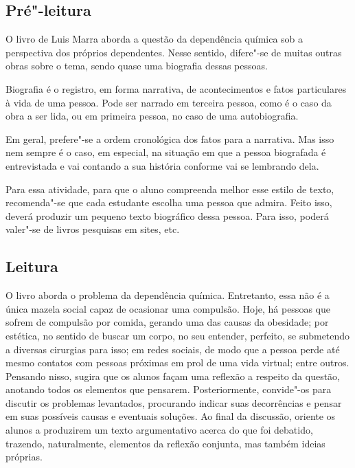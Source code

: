 \documentclass{article}
\begin{document}
\subsection{Pré"-leitura}


O livro de Luis Marra aborda a questão da dependência
química sob a perspectiva dos próprios dependentes. Nesse sentido,
difere"-se de muitas outras obras sobre o tema, sendo quase uma biografia
dessas pessoas.

Biografia é o registro, em forma narrativa, de acontecimentos e fatos
particulares à vida de uma pessoa. Pode ser narrado em terceira pessoa,
como é o caso da obra a ser lida, ou em primeira pessoa, no caso de uma
autobiografia.

Em geral, prefere"-se a ordem cronológica dos fatos para a narrativa. Mas
isso nem sempre é o caso, em especial, na situação em que a pessoa
biografada é entrevistada e vai contando a sua história conforme vai se
lembrando dela.

Para essa atividade, para que o aluno compreenda melhor esse estilo de
texto, recomenda"-se que cada estudante escolha uma pessoa que admira.
Feito isso, deverá produzir um pequeno texto biográfico dessa pessoa.
Para isso, poderá valer"-se de livros pesquisas em sites, etc.

\subsection{Leitura}


O livro aborda o problema da dependência química.
Entretanto, essa não é a única mazela social capaz de ocasionar uma
compulsão. Hoje, há pessoas que sofrem de compulsão por comida, gerando
uma das causas da obesidade; por estética, no sentido de buscar um
corpo, no seu entender, perfeito, se submetendo a diversas cirurgias
para isso; em redes sociais, de modo que a pessoa perde até mesmo
contatos com pessoas próximas em prol de uma vida virtual; entre outros.
Pensando nisso, sugira que os alunos façam uma reflexão a respeito da
questão, anotando todos os elementos que pensarem. Posteriormente,
convide"-os para discutir os problemas levantados, procurando indicar
suas decorrências e pensar em suas possíveis causas e eventuais
soluções. Ao final da discussão, oriente os alunos a produzirem um texto
argumentativo acerca do que foi debatido, trazendo, naturalmente,
elementos da reflexão conjunta, mas também ideias próprias.
\end{document}
